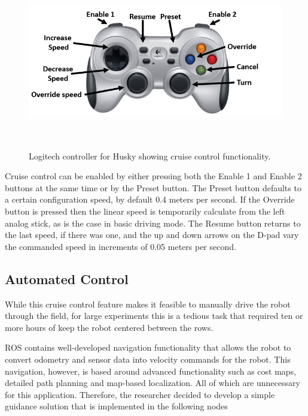 \begin{figure}[htb]
	\centering
    \includegraphics[height=3in]{figures/logitech_controller_labelled.png}
    \caption[Cruise control buttons]{Logitech controller for Husky showing cruise control functionality.}
    \label{figure:cruise_control}
\end{figure}

Cruise control can be enabled by either pressing both the Enable 1 and Enable 2 buttons at the same time or by the Preset button.  The Preset button defaults to a certain configuration speed, by default 0.4 meters per second.  If the Override button is pressed then the linear speed is temporarily calculate from the left analog stick, as is the case in basic driving mode.  The Resume button returns to the last speed, if there was one, and the up and down arrows on the D-pad vary the commanded speed in increments of 0.05 meters per second.    

\subsection{Automated Control}
\label{section:automated_control}

While this cruise control feature makes it feasible to manually drive the robot through the field, for large experiments this is a tedious task that required ten or more hours of keep the robot centered between the rows.

ROS contains well-developed navigation functionality that allows the robot to convert odometry and sensor data into velocity commands for the robot.  This navigation, however, is based around advanced functionality such as cost maps, detailed path planning and map-based localization. All of which are unnecessary for this application.  Therefore, the researcher decided to develop a simple guidance solution that is implemented in the following nodes

